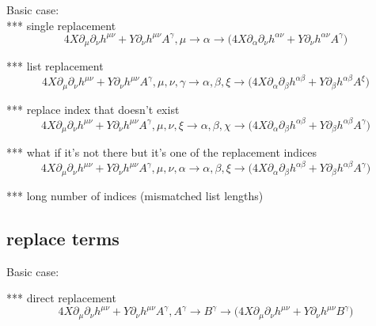 \documentclass{article}
\def\){\Big)}
\def\({\Big(}
\begin{document}
Basic case:\\

*** single replacement
\begin{equation}
4X \partial_{\mu} \partial_{\nu}h^{\mu \nu} +Y \partial_{\nu}h^{\mu \nu} A^{\gamma} , \mu \rightarrow \alpha \rightarrow 
\(4 X \partial_{\alpha}\partial_{\nu}h^{\alpha \nu} +Y \partial_{\nu}h^{\alpha \nu} A^{\gamma} \)
\end{equation}

*** list replacement
\begin{equation}
4X \partial_{\mu} \partial_{\nu}h^{\mu \nu} +Y \partial_{\nu}h^{\mu \nu} A^{\gamma} , \mu, \nu, \gamma \rightarrow \alpha, \beta, \xi \rightarrow 
 \(4 X \partial_{\alpha}\partial_{\beta}h^{\alpha \beta} +Y \partial_{\beta}h^{\alpha \beta} A^{\xi} \)
\end{equation}

*** replace index that doesn’t exist
\begin{equation}
4X \partial_{\mu} \partial_{\nu}h^{\mu \nu} +Y \partial_{\nu}h^{\mu \nu} A^{\gamma} , \mu, \nu, \xi \rightarrow \alpha, \beta, \chi \rightarrow 
\(4 X \partial_{\alpha}\partial_{\beta}h^{\alpha \beta} +Y \partial_{\beta}h^{\alpha \beta} A^{\gamma} \)
\end{equation}

*** what if it’s not there but it’s one of the replacement indices
\begin{equation}
4X \partial_{\mu} \partial_{\nu}h^{\mu \nu} +Y \partial_{\nu}h^{\mu \nu} A^{\gamma} , \mu, \nu, \alpha \rightarrow \alpha, \beta, \xi \rightarrow 
\(4 X \partial_{\alpha}\partial_{\beta}h^{\alpha \beta} +Y \partial_{\beta}h^{\alpha \beta} A^{\gamma} \)
\end{equation}

*** long number of indices (mismatched list lengths) 



\subsection{replace terms}

Basic case:

*** direct replacement
\begin{equation}
4X \partial_{\mu} \partial_{\nu}h^{\mu \nu} +Y \partial_{\nu}h^{\mu \nu} A^{\gamma} , A^{\gamma} \rightarrow B^{\gamma} \rightarrow  
\(4 X \partial_{\mu}\partial_{\nu}h^{\mu \nu} +Y \partial_{\nu}h^{\mu \nu} B^{\gamma} \)
\end{equation}
\end{document}
